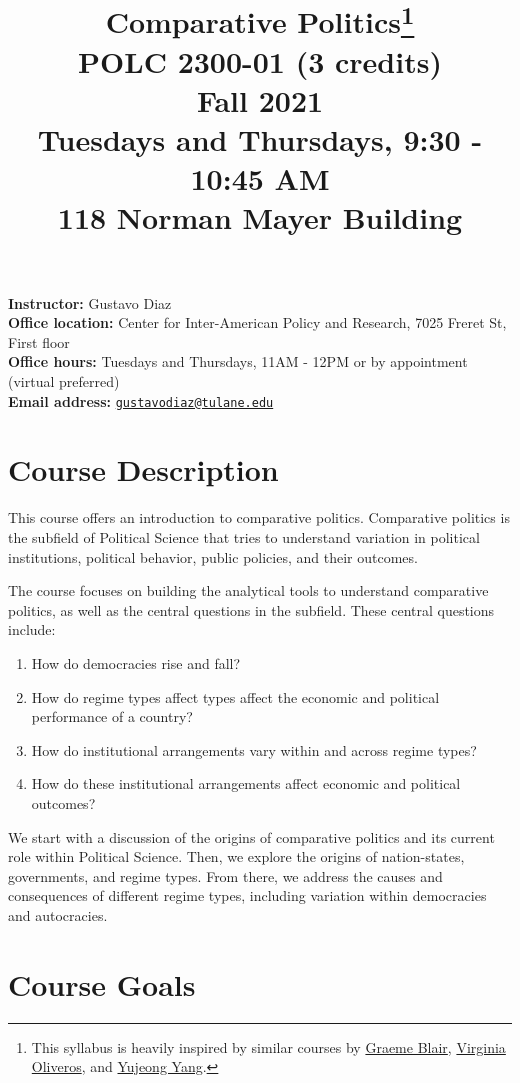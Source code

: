 \documentclass[
  11pt,
]{article}
\title{Comparative Politics\footnote{This syllabus is heavily inspired
  by similar courses by \href{https://graemeblair.com/}{Graeme Blair},
  \href{https://virginiaoliveros.com/}{Virginia Oliveros}, and
  \href{http://yujeongyang.weebly.com/}{Yujeong Yang}.}\\
POLC 2300-01 (3 credits)\\
Fall 2021\\
Tuesdays and Thursdays, 9:30 - 10:45 AM\\
118 Norman Mayer Building}
\author{}
\date{\vspace{-2.5em}}
\providecommand{\tightlist}{%
  \setlength{\itemsep}{0pt}\setlength{\parskip}{0pt}}
\begin{document}
\maketitle

\textbf{Instructor:} Gustavo Diaz\\
\textbf{Office location:} Center for Inter-American Policy and Research,
7025 Freret St, First floor\\
\textbf{Office hours:} Tuesdays and Thursdays, 11AM - 12PM or by
appointment (virtual preferred)\\
\textbf{Email address:}
\href{mailto:gustavodiaz@tulane.edu}{\nolinkurl{gustavodiaz@tulane.edu}}

\hypertarget{course-description}{%
\section{Course Description}\label{course-description}}

This course offers an introduction to comparative politics. Comparative
politics is the subfield of Political Science that tries to understand
variation in political institutions, political behavior, public
policies, and their outcomes.

The course focuses on building the analytical tools to understand
comparative politics, as well as the central questions in the subfield.
These central questions include:

\begin{enumerate}
\def\labelenumi{\arabic{enumi}.}
\tightlist
\item
  How do democracies rise and fall?
\item
  How do regime types affect types affect the economic and political
  performance of a country?
\item
  How do institutional arrangements vary within and across regime types?
\item
  How do these institutional arrangements affect economic and political
  outcomes?
\end{enumerate}

We start with a discussion of the origins of comparative politics and
its current role within Political Science. Then, we explore the origins
of nation-states, governments, and regime types. From there, we address
the causes and consequences of different regime types, including
variation within democracies and autocracies.

\hypertarget{course-goals}{%
\section{Course Goals}\label{course-goals}}
\end{document}
